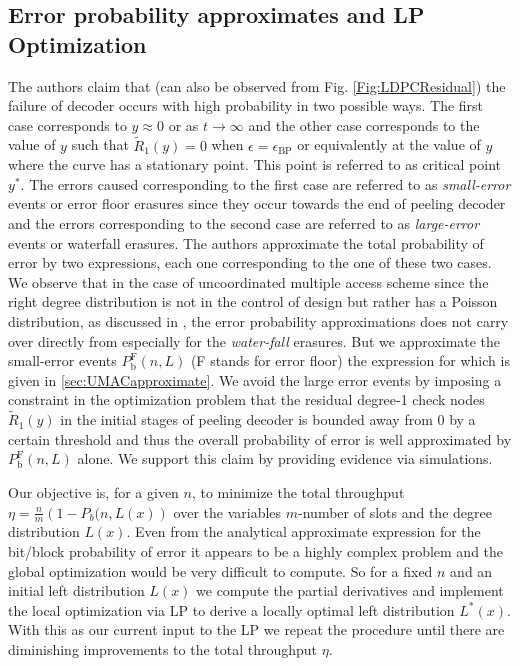 \subsection{Error probability approximates and LP Optimization}
 The authors \cite{amraoui2007find} claim that (can also be observed from Fig. \ref{Fig:LDPCResidual}) the failure of decoder occurs with high probability in two possible ways. The first case corresponds to $y\approx 0$ or as $t\rightarrow \infty$ and the other case corresponds to the value of $y$ such that $\tilde{R}_{1}(y)=0$ when $\epsilon=\epsilon_{\text{BP}}$ or equivalently at the value of $y$ where the curve has a stationary point. This point is referred to as critical point $y^*.$ The errors caused corresponding to the first case are referred to as \textit{small-error} events or error floor erasures since they occur towards the end of peeling decoder and the errors corresponding to the second case are referred to as \textit{large-error} events or waterfall erasures. The authors approximate the total probability of error by two expressions, each one corresponding to the one of these two cases. We observe that in the case of uncoordinated multiple access scheme since the right degree distribution is not in the control of design but rather has a Poisson distribution, as discussed in \cite{narayanan2012iterative}, the error probability approximations does not carry over directly from \cite{amraoui2007find} especially for the \textit{water-fall} erasures. But we approximate the small-error events $P_{\text{b}}^{\text{F}}(n,L)$ (F stands for error floor) the expression for which is given in \ref{sec:UMACapproximate}. We avoid the large error events by imposing a constraint in the optimization problem that the residual degree-1 check nodes $\tilde{R}_1(y)$ in the initial stages of peeling decoder is bounded away from $0$ by a certain threshold and thus the overall probability of error is well approximated by $P_{\text{b}}^{\text{F}}(n,L)$ alone. We support this claim by providing evidence via simulations.
 
Our objective is, for a given $n$, to minimize the total throughput $\eta=\frac{n}{m}\left(1-P_{b}(n,L(x)\right)$ over the variables $m$-number of slots and the degree distribution $L(x)$. Even from the analytical approximate expression for the bit/block probability of error it appears to be a highly complex problem and the global optimization would be very difficult to compute. So for a fixed $n$ and an initial left distribution $L(x)$ we compute the partial derivatives and implement the local optimization via LP to derive a locally optimal left distribution $L^{*}(x)$. With this as our current input to the LP we repeat the procedure until there are diminishing improvements to the total throughput $\eta$.
